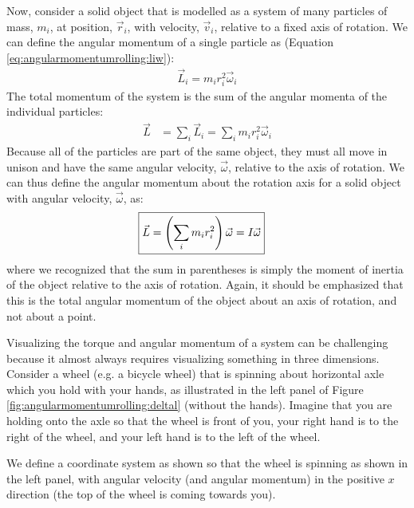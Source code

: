 Now, consider a solid object that is modelled as a system of many particles of mass, $m_i$, at position, $\vec r_i$, with velocity, $\vec v_i$, relative to a fixed axis of rotation. We can define the angular momentum of a single particle as (Equation \ref{eq:angularmomentumrolling:liw}):
\begin{align*}
\vec L_i = m_i r_i^2 \vec \omega_i
\end{align*}
The total momentum of the system is the sum of the angular momenta of the individual particles:
\begin{align*}
\vec L &= \sum_i\vec L_i = \sum_i  m_i r_i^2 \vec \omega_i
\end{align*}
Because all of the particles are part of the same object, they must all move in unison and have the same angular velocity, $\vec\omega$, relative to the axis of rotation. We can thus define the angular momentum about the rotation axis for a solid object with angular velocity, $\vec\omega$, as:
\begin{align}
\Aboxed{\vec L &= \left(\sum_i  m_i r_i^2\right) \vec \omega = I\vec\omega}
\end{align}
where we recognized that the sum in parentheses is simply the moment of inertia of the object relative to the axis of rotation. Again, it should be emphasized that this is the total angular momentum of the object about an axis of rotation, and not about a point. 

Visualizing the torque and angular momentum of a system can be challenging because it almost always requires visualizing something in three dimensions. Consider a wheel (e.g. a bicycle wheel) that is spinning about horizontal axle which you hold with your hands, as illustrated in the left panel of Figure \ref{fig:angularmomentumrolling:deltal} (without the hands). Imagine that you are holding onto the axle so that the wheel is front of you, your right hand is to the right of the wheel, and your left hand is to the left of the wheel.

We define a coordinate system as shown so that the wheel is spinning as shown in the left panel, with angular velocity (and angular momentum) in the positive $x$ direction (the top of the wheel is coming towards you).

